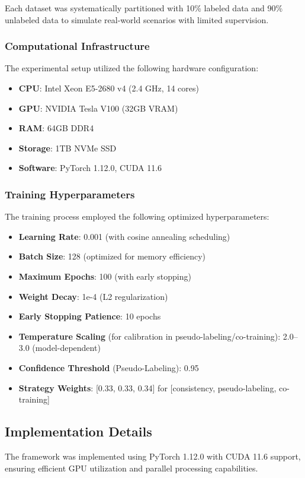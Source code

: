 \documentclass{ieeeaccess}
\begin{document}
Each dataset was systematically partitioned with 10\% labeled data and 90\% unlabeled data to simulate real-world scenarios with limited supervision.

\subsubsection{Computational Infrastructure}
The experimental setup utilized the following hardware configuration:
\begin{itemize}
\item \textbf{CPU}: Intel Xeon E5-2680 v4 (2.4 GHz, 14 cores)
\item \textbf{GPU}: NVIDIA Tesla V100 (32GB VRAM)
\item \textbf{RAM}: 64GB DDR4
\item \textbf{Storage}: 1TB NVMe SSD
\item \textbf{Software}: PyTorch 1.12.0, CUDA 11.6
\end{itemize}

\subsubsection{Training Hyperparameters}
The training process employed the following optimized hyperparameters:
\begin{itemize}
\item \textbf{Learning Rate}: 0.001 (with cosine annealing scheduling)
\item \textbf{Batch Size}: 128 (optimized for memory efficiency)
\item \textbf{Maximum Epochs}: 100 (with early stopping)
\item \textbf{Weight Decay}: 1e-4 (L2 regularization)
\item \textbf{Early Stopping Patience}: 10 epochs
\item \textbf{Temperature Scaling} (for calibration in pseudo-labeling/co-training): 2.0--3.0 (model-dependent)
\item \textbf{Confidence Threshold} (Pseudo-Labeling): 0.95
\item \textbf{Strategy Weights}: [0.33, 0.33, 0.34] for [consistency, pseudo-labeling, co-training]
\end{itemize}

\subsection{Implementation Details}
The framework was implemented using PyTorch 1.12.0 with CUDA 11.6 support, ensuring efficient GPU utilization and parallel processing capabilities.
\end{document}
